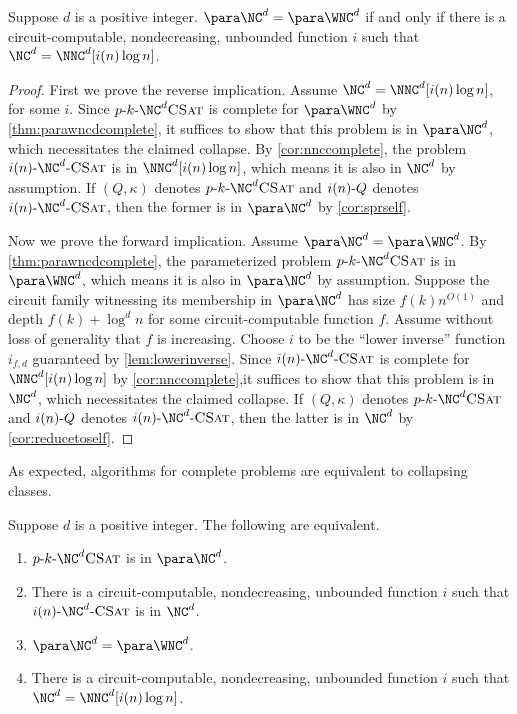 \begin{theorem}\label{thm:ncwnc}
  Suppose $d$ is a positive integer.
  $\para \NC^d = \para \WNC^d$ if and only if there is a circuit-computable, nondecreasing, unbounded function $i$ such that $\NC^d = \NNC^d[i(n) \log n]$.
\end{theorem}
\begin{proof}
  First we prove the reverse implication.
  Assume $\NC^d = \NNC^d[i(n) \log n]$, for some $i$.
  Since $\pNCSAT$ is complete for $\para \WNC^d$ by \autoref{thm:parawncdcomplete}, it suffices to show that this problem is in $\para \NC^d$, which necessitates the claimed collapse.
  By \autoref{cor:nnccomplete}, the problem $\iNCSAT$ is in $\NNC^d[i(n) \log n]$, which means it is also in $\NC^d$ by assumption.
  If $(Q, \kappa)$ denotes $\pNCSAT$ and $i(n) \textnormal{-} Q$ denotes $\iNCSAT$, then the former is in $\para \NC^d$ by \autoref{cor:sprself}.

  Now we prove the forward implication.
  Assume $\para \NC^d = \para \WNC^d$.
  By \autoref{thm:parawncdcomplete}, the parameterized problem $\pNCSAT$ is in $\para \WNC^d$, which means it is also in $\para \NC^d$ by assumption.
  Suppose the circuit family witnessing its membership in $\para \NC^d$ has size $f(k) n^{O(1)}$ and depth $f(k) + \log^d n$ for some circuit-computable function $f$.
  Assume without loss of generality that $f$ is increasing.
  Choose $i$ to be the ``lower inverse'' function $i_{f, d}$ guaranteed by \autoref{lem:lowerinverse}.
  Since $\iNCSAT$ is complete for $\NNC^d[i(n) \log n]$ by \autoref{cor:nnccomplete},it suffices to show that this problem is in $\NC^d$, which necessitates the claimed collapse.
  If $(Q, \kappa)$ denotes $\pNCSAT$ and $i(n) \textnormal{-} Q$ denotes $\iNCSAT$, then the latter is in $\NC^d$ by \autoref{cor:reducetoself}.
\end{proof}

As expected, algorithms for complete problems are equivalent to collapsing classes.

\begin{corollary}
  Suppose $d$ is a positive integer.
  The following are equivalent.
  \begin{enumerate}
  \item $\pNCSAT$ is in $\para \NC^d$.
  \item There is a circuit-computable, nondecreasing, unbounded function $i$ such that $\iNCSAT$ is in $\NC^d$.
  \item $\para \NC^d = \para \WNC^d$.
  \item There is a circuit-computable, nondecreasing, unbounded function $i$ such that $\NC^d = \NNC^d[i(n) \log n]$.
  \end{enumerate}
\end{corollary}

